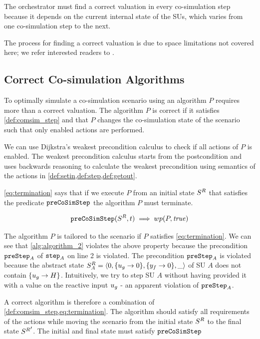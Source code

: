 The orchestrator must find a correct valuation in every co-simulation step because it depends on the current internal state of the SUs, which varies from one co-simulation step to the next.

The process for finding a correct valuation is due to space limitations not covered here; we refer interested readers to \cite{thrane2021,Kubler2000}.

\subsection{Correct Co-simulation Algorithms}\label{sec:correctcosim}
To optimally simulate a co-simulation scenario using an algorithm $P$ requires more than a correct valuation. 
The algorithm $P$ is correct if it satisfies \cref{def:comsim_step} and that $P$ changes the co-simulation state of the scenario such that only enabled actions are performed.

We can use Dijkstra's weakest precondition calculus \cite{dijkstra_guarded_1975} to check if all actions of $P$ is enabled.
The weakest precondition calculus starts from the postcondition and uses backwards reasoning to calculate the weakest precondition using semantics of the actions in \cref{def:setin,def:step,def:getout}.

\cref{eq:termination} says that if we execute $P$ from an initial state $S^{R}_{}$ that satisfies the predicate $\mathtt{preCoSimStep}$ the algorithm $P$ must terminate.

\begin{align}\label{eq:termination}
  \mathtt{preCoSimStep}(S^{R}_{}, t) \implies wp(P, \mathit{true})
\end{align}

The algorithm $P$ is tailored to the scenario if $P$ satisfies \cref{eq:termination}.
We can see that \cref{alg:algorithm_2} violates the above property because the precondition $\mathtt{preStep}_{A}$ of $\mathtt{step}_{A}$ on line 2 is violated.
The precondition $\mathtt{preStep}_{A}$ is violated because the abstract state $S^{R}_{A} =  \left\langle 0,\{u_{g} \to 0 \}, \{y_{f} \to 0 \}, \_ \right\rangle $ of SU $A$ does not contain $\{u_{g} \to H \}$.
Intuitively, we try to step SU $A$ without having provided it with a value on the reactive input $u_{g}$ - an apparent violation of $\mathtt{preStep}_{A}$.

A correct algorithm is therefore a combination of \cref{def:comsim_step,eq:termination}.
The algorithm should satisfy all requirements of the actions while moving the scenario from the initial state $S^{R}_{}$ to the final state ${S^{R}_{}}'$.
The initial and final state must satisfy $\mathtt{preCoSimStep}$

